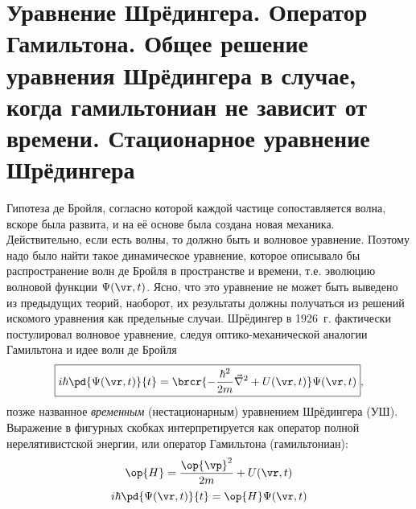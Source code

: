 \begin{sloppypar}
  \section{Уравнение Шрёдингера. Оператор Гамильтона. Общее решение уравнения Шрёдингера в случае, когда гамильтониан не зависит от времени. Стационарное уравнение Шрёдингера}
\end{sloppypar}

Гипотеза де Бройля, согласно которой каждой частице сопоставляется волна, вскоре была развита, и на её основе была создана новая механика. Действительно, если есть волны, то должно быть и волновое уравнение. Поэтому надо было найти такое динамическое уравнение, которое описывало бы распространение волн де Бройля в пространстве и времени, т.е. эволюцию волновой функции $\Psi(\vr, t)$. Ясно, что это уравнение не может быть выведено из предыдущих теорий, наоборот, их результаты должны получаться из решений искомого уравнения как предельные случаи. Шрёдингер\footnotemark{} в 1926~г. фактически постулировал волновое уравнение, следуя оптико-механической аналогии Гамильтона\footnotemark{} и идее волн де Бройля
%
\begin{equation}
\label{eq:1_3_1}
\boxed{
  i \hbar \pd{\Psi(\vr,t)}{t} =
    \brcr{-\frac{\hbar^2}{2m}\vec{\nabla}^2 + U(\vr,t)} \Psi(\vr,t)
}, 
\end{equation}%
%
позже названное {\em временным} (нестационарным) уравнением Шрёдингера (УШ). Выражение в фигурных скобках интерпретируется как оператор полной нерелятивистской энергии, или оператор Гамильтона (гамильтониан):
$$
\op{H} = \frac{\op{\vp}^2}{2m} + U(\vr,t)
$$
\begin{equation}
\label{eq:1_3_2}
i \hbar \pd{\Psi(\vr,t)}{t} = \op{H} \Psi(\vr,t)
\end{equation}

